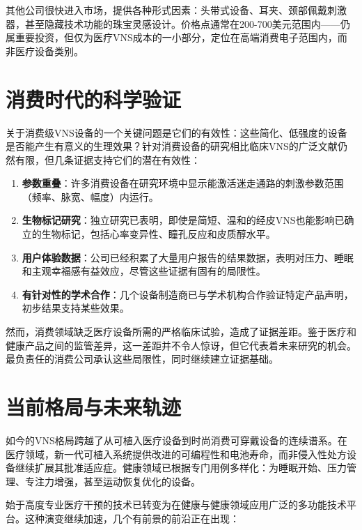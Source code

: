 \documentclass[
  Letterpaper,
]{scrbook}
\begin{document}
其他公司很快进入市场，提供各种形式因素：头带式设备、耳夹、颈部佩戴刺激器，甚至隐藏技术功能的珠宝灵感设计。价格点通常在200-700美元范围内------仍属重要投资，但仅为医疗VNS成本的一小部分，定位在高端消费电子范围内，而非医疗设备类别。

\section{消费时代的科学验证}\label{ux6d88ux8d39ux65f6ux4ee3ux7684ux79d1ux5b66ux9a8cux8bc1}

关于消费级VNS设备的一个关键问题是它们的有效性：这些简化、低强度的设备是否能产生有意义的生理效果？针对消费设备的研究相比临床VNS的广泛文献仍然有限，但几条证据支持它们的潜在有效性：

\begin{enumerate}
\def\labelenumi{\arabic{enumi}.}
\item
  \textbf{参数重叠}：许多消费设备在研究环境中显示能激活迷走通路的刺激参数范围（频率、脉宽、幅度）内运行。
\item
  \textbf{生物标记研究}：独立研究已表明，即使是简短、温和的经皮VNS也能影响已确立的生物标记，包括心率变异性、瞳孔反应和皮质醇水平。
\item
  \textbf{用户体验数据}：公司已经积累了大量用户报告的结果数据，表明对压力、睡眠和主观幸福感有益效应，尽管这些证据有固有的局限性。
\item
  \textbf{有针对性的学术合作}：几个设备制造商已与学术机构合作验证特定产品声明，初步结果支持某些效果。
\end{enumerate}

然而，消费领域缺乏医疗设备所需的严格临床试验，造成了证据差距。鉴于医疗和健康产品之间的监管差异，这一差距并不令人惊讶，但它代表着未来研究的机会。最负责任的消费公司承认这些局限性，同时继续建立证据基础。

\section{当前格局与未来轨迹}\label{ux5f53ux524dux683cux5c40ux4e0eux672aux6765ux8f68ux8ff9}

如今的VNS格局跨越了从可植入医疗设备到时尚消费可穿戴设备的连续谱系。在医疗领域，新一代可植入系统提供改进的可编程性和电池寿命，而非侵入性处方设备继续扩展其批准适应症。健康领域已根据专门用例多样化：为睡眠开始、压力管理、专注力增强，甚至运动恢复优化的设备。

始于高度专业医疗干预的技术已转变为在健康与健康领域应用广泛的多功能技术平台。这种演变继续加速，几个有前景的前沿正在出现：
\end{document}
